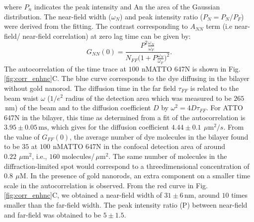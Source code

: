 \documentclass[journal=jpccck,manuscript=article]{achemso}
\newcommand{\nm}{\ensuremath{\,\textrm{nm}}}
\newcommand{\um}{\ensuremath{\,\mu\textrm{m}}}
\newcommand{\uM}{\ensuremath{\,\mu\textrm{M}}}
\newcommand{\nM}{\ensuremath{\,\textrm{nM}}}
\newcommand{\ms}{\ensuremath{\,\textrm{ms}}}
\begin{document}
where $P_n$ indicates the peak intensity and An the area of the Gaussian distribution. 
The near-field width ($\omega_N$) and peak intensity ratio ($P_N=P_N/P_F$) were derived from the fitting. 
The contrast corresponding to
$A_{NN}$ term (i.e near-field/ near-field correlation) at zero lag time can be given by:
\begin{equation}
	G_{NN}(0) = \frac{P^2\frac{\omega_N}{\omega_F}} {N_{FF}\Big(1+P\frac{\omega_N}{\omega_F}\Big)^2}.
	\label{eqm:contrast_enhnc}
\end{equation}
The autocorrelation of the time trace at $100~$\nM ATTO 647N is shown in Fig.\ref{fig:corr_enhnc}C. The blue curve 
corresponds to the dye diffusing in the bilayer without gold nanorod. The diffusion time in the far field $\tau_{FF}$ 
is related to the beam waist $\omega$ ($1/e^2$ radius of the detection area which was measured to be $265~$\nm) of 
the beam and to the diffusion coefficient $D$ by $\omega^2=4D\tau_{FF}$. For ATTO 647N in the bilayer, this time as 
determined from a fit of the autocorrelation is $3.95\pm0.05$\ms, which gives for the diffusion 
coefficient $4.44\pm0.1~\um^2/s$. From the value of $G_{FF}(0)$, the average number of dye molecules in the bilayer 
found to be $35$ at $100~$\nM ATTO 647N in the confocal detection area of 
around $0.22~\um^2$, i.e., $160$ molecules/$\um^2$. The same number of molecules in the diffraction-limited spot 
would correspond to a threedimensional concentration of $0.8~$\uM. In the presence of gold nanorods, an extra 
component on a smaller time scale in the autocorrelation is observed. From the red curve in Fig.\ref{fig:corr_enhnc}C, 
we obtained a near-field width of $31\pm6\nm$, around $10$ times smaller than the far-field width. The peak intensity 
ratio (P) between near-field and far-field was obtained to be $5\pm1.5$.\\
\end{document}
